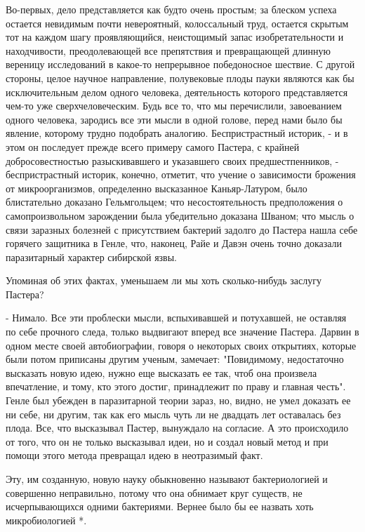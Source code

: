 Во-первых, дело  представляется  как  будто очень  простым;  за  блеском
успеха остается невидимым почти невероятный, колоссальный труд, остается
скрытым  тот   на   каждом   шагу   проявляющийся,   неистощимый   запас
изобретательности  и  находчивости,  преодолевающей  все  препятствия  и
превращающей  длинную  вереницу  исследований  в  какое-то   непрерывное
победоносное шествие.  С  другой  стороны,  целое  научное  направление,
полувековые плоды  пауки являются  как  бы исключительным  делом  одного
человека,    деятельность    которого    представляется    чем-то    уже
сверхчеловеческим. Будь все то,  что мы перечислили, завоеванием  одного
человека, зародись все  эти мысли  в одной  голове, перед  нами было  бы
явление, которому трудно подобрать аналогию. Беспристрастный историк,  -
и в этом  он последует прежде  всего примеру самого  Пастера, с  крайней
добросовестностью разыскивавшего и указавшего своих предшестпенников,  -
беспристрастный историк,  конечно,  отметит, что  учение  о  зависимости
брожения от  микроорганизмов,  определенно  высказанное  Каньяр-Латуром,
было   блистательно   доказано   Гельмгольцем;   что   несостоятельность
предположения о  самопроизвольном зарождении  была убедительно  доказана
Шваном; что  мысль о  связи заразных  болезней с  присутствием  бактерий
задолго до Пастера нашла себе горячего защитника в Генле, что,  наконец,
Райе и Давэн очень точно доказали паразитарный характер сибирской язвы.

Упоминая об этих  фактах, уменьшаем  ли мы  хоть сколько-нибудь  заслугу
Пастера?

- Нимало.  Все  эти  проблески  мысли,  вспыхивавшей  и  потухавшей,  не
оставляя по себе  прочного следа, только  выдвигают вперед все  значение
Пастера. Дарвин в  одном месте своей  автобиографии, говоря о  некоторых
своих открытиях, которые были  потом приписаны другим ученым,  замечает:
"Повидимому, недостаточно высказать новую  идею, нужно еще высказать  ее
так,  чтоб  она  произвела  впечатление,  и  тому,  кто  этого   достиг,
принадлежит по праву и главная честь". Генле был убежден в  паразитарной
теории зараз, но, видно, не умел доказать ее ни себе, ни другим, так как
его мысль  чуть  ли не  двадцать  лет  оставалась без  плода.  Все,  что
высказывал Пастер, вынуждало на согласие. А это происходило от того, что
он не только высказывал идеи, но и создал новый метод и при помощи этого
метода превращал идею в неотразимый факт.

Эту, им  созданную, новую  науку обыкновенно  называют бактериологией  и
совершенно  неправильно,  потому  что  она  обнимает  круг  существ,  не
исчерпывающихся одними  бактериями.  Вернее  было  бы  ее  назвать  хоть
микробиологией *.


